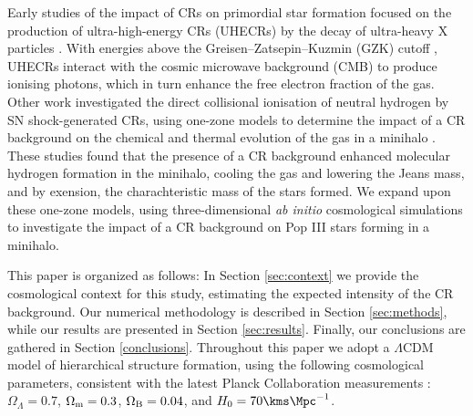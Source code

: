 Early studies of the impact of CRs on primordial star formation focused on the production of ultra-high-energy CRs (UHECRs) by the decay of ultra-heavy X particles \citep{ShchekinovVasiliev2004,VasilievShchekinov2006,RipamontiMapelliFerrara2007}.  With energies above the Greisen--Zatsepin--Kuzmin (GZK) cutoff \citep{Greisen1966,ZatsepinKuzmin1966}, UHECRs interact with the cosmic microwave background (CMB) to produce ionising photons, which in turn enhance the free electron fraction of the gas.  
Other work investigated the direct collisional ionisation of neutral hydrogen by SN shock-generated CRs, using one-zone models to determine the impact of a CR background on the chemical and thermal evolution of the gas in a minihalo \citep{StacyBromm2007,JascheCiardiEnsslin2007}.  These studies found that the presence of a CR background enhanced molecular hydrogen formation in the minihalo, cooling the gas and lowering the Jeans mass, and by exension, the charachteristic mass of the stars formed. We expand upon these one-zone models, using three-dimensional \textit{ab initio} cosmological simulations to investigate the impact of a CR background on Pop III stars forming in a minihalo.

This paper is organized as follows: In Section \ref{sec:context} we provide the cosmological context for this study, estimating the expected intensity of the CR background. Our numerical methodology is described in Section \ref{sec:methods}, while our results are presented in Section \ref{sec:results}.  Finally, our conclusions are gathered in Section \ref{conclusions}. Throughout this paper we adopt a $\Lambda$CDM model of hierarchical structure formation, using the following cosmological parameters, consistent with the latest Planck Collaboration measurements \citep{PlanckParams2015}: $\Omega_{\Lambda} = 0.7$, $\Omega_{\rm m} = 0.3$, $\Omega_{\rm B} = 0.04$, and $H_0 = 70 \kms \Mpc^{-1}$.